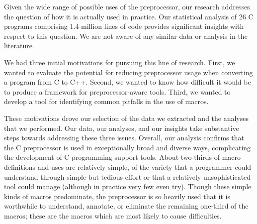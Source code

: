 \documentclass[10pt]{article}
\def\numpackages{26}
\def\numlinesalmost{1.4 million}
\begin{document}
Given the wide range of possible uses of the preprocessor, our
research addresses the question of how it is actually used in
practice.  Our statistical analysis of {\numpackages} C programs
comprising {\numlinesalmost} lines of code provides significant
insights with respect to this question.  We are not aware of any
similar data or analysis in the literature.

We had three initial motivations for pursuing this line of research.
First, we wanted to evaluate the potential for reducing
preprocessor usage when converting a program from C to C++.
Second, we wanted to know how difficult it would be to produce a
framework for preprocessor-aware tools.  Third, we wanted to develop a
tool for identifying common pitfalls in the use of macros.

These motivations drove our selection of the data we extracted and the
analyses that we performed.  Our data, our analyses, and our insights
take substantive steps towards addressing these three issues.
Overall, our analysis confirms that the C preprocessor is used in
exceptionally broad and diverse ways, complicating the development of
C programming support tools.  About two-thirds of macro definitions
and uses are relatively simple, of the variety that a programmer could
understand through simple but tedious effort or that a relatively
unsophisticated tool could manage (although in practice very few even
try).  Though these simple kinds of macros predominate, the preprocessor is so
heavily used that it is worthwhile to understand, annotate, or
eliminate the remaining one-third of the macros; these are the macros which are most likely
to cause difficulties.

%
%
\end{document}
